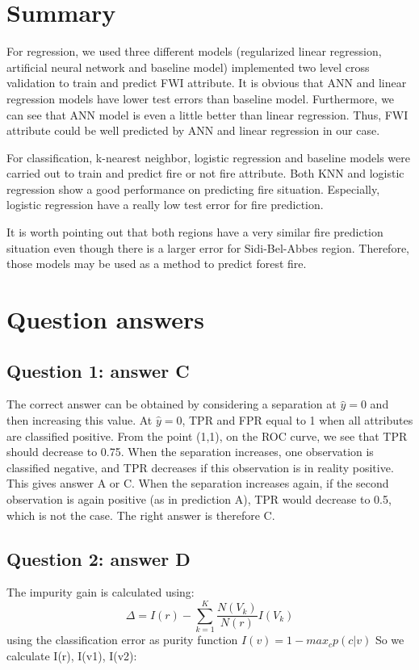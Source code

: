 \documentclass[10pt]{article}
\numberwithin{equation}{section}
\numberwithin{figure}{section}
\numberwithin{table}{section}
\begin{document}
\section{Summary}
For regression, we used three different models (regularized linear regression, artificial neural network and baseline model) implemented two level cross validation to train and predict FWI attribute. It is obvious that ANN and linear regression models have lower test errors than baseline model. Furthermore, we can see that ANN model is even a little better than linear
regression. Thus, FWI attribute could be well predicted by ANN and linear regression in our case.

For classification, k-nearest neighbor, logistic regression and baseline models were carried out to train and predict fire or not fire attribute. Both KNN and logistic regression show a good performance on predicting fire situation. Especially, logistic regression have a really low test error for fire prediction.

It is worth pointing out that both regions have a very similar fire prediction situation even though there is a larger error for Sidi-Bel-Abbes region. Therefore, those models may be used as a method to predict forest fire. 

\section{Question answers}

\subsection*{Question 1: answer C}

The correct answer can be obtained by considering a separation at $\hat{y}=0$ and then increasing this value. At $\hat{y}=0$, TPR and FPR equal to 1 when all attributes are classified positive. From the point (1,1), on the ROC curve, we see that TPR should decrease to 0.75. When the separation increases, one observation is classified negative, and TPR decreases if this observation is in reality positive. This gives answer A or C. When the separation increases again, if the second observation is again positive (as in prediction A), TPR would decrease to 0.5, which is not the case. The right answer is therefore C.

\subsection*{Question 2: answer D}
The impurity gain is calculated using:
\begin{equation*}
    \Delta = I(r) - \sum_{k = 1}^{K}\frac{N(V_{k})}{N(r)}I(V_k)
\end{equation*}
using the classification error as purity function $I(v) = 1 - max_c p(c|v) $
So we calculate I(r), I(v1), I(v2):
\end{document}
